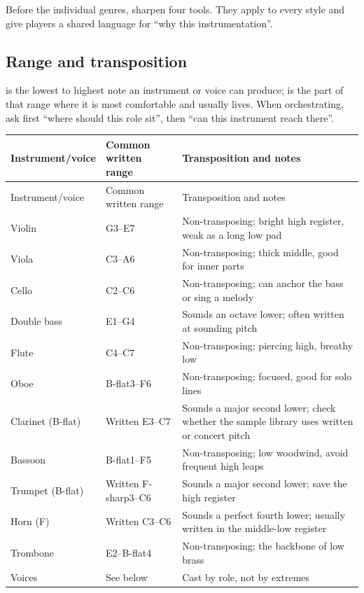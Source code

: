 Before the individual genres, sharpen four tools. They apply to every style and give players a shared language for ``why this instrumentation''.

\subsection{Range and transposition}
\label{sec:range-transposition}

 is the lowest to highest note an instrument or voice can produce;  is the part of that range where it is most comfortable and usually lives. When orchestrating, ask first ``where should this role sit'', then ``can this instrument reach there''.

\begin{longtable}{p{}p{}p{}}
\toprule
Instrument/voice & Common written range & Transposition and notes \\
\midrule
\endfirsthead
\toprule
Instrument/voice & Common written range & Transposition and notes \\
\midrule
\endhead
Violin & G3--E7 & Non-transposing; bright high register, weak as a long low pad \\
Viola & C3--A6 & Non-transposing; thick middle, good for inner parts \\
Cello & C2--C6 & Non-transposing; can anchor the bass or sing a melody \\
Double bass & E1--G4 & Sounds an octave lower; often written at sounding pitch \\
Flute & C4--C7 & Non-transposing; piercing high, breathy low \\
Oboe & B-flat3--F6 & Non-transposing; focused, good for solo lines \\
Clarinet (B-flat) & Written E3--C7 & Sounds a major second lower; check whether the sample library uses written or concert pitch \\
Bassoon & B-flat1--F5 & Non-transposing; low woodwind, avoid frequent high leaps \\
Trumpet (B-flat) & Written F-sharp3--C6 & Sounds a major second lower; save the high register \\
Horn (F) & Written C3--C6 & Sounds a perfect fourth lower; usually written in the middle-low register \\
Trombone & E2--B-flat4 & Non-transposing; the backbone of low brass \\
Voices & See below & Cast by role, not by extremes \\
\bottomrule
\end{longtable}

